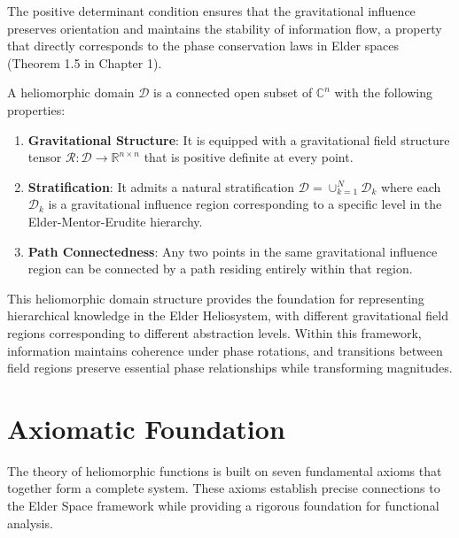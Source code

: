 \begin{remark}
The positive determinant condition ensures that the gravitational influence preserves orientation and maintains the stability of information flow, a property that directly corresponds to the phase conservation laws in Elder spaces (Theorem 1.5 in Chapter 1).
\end{remark}

\begin{definition}
A heliomorphic domain $\mathcal{D}$ is a connected open subset of $\mathbb{C}^n$ with the following properties:
\begin{enumerate}
    \item \textbf{Gravitational Structure}: It is equipped with a gravitational field structure tensor $\mathcal{R}: \mathcal{D} \rightarrow \mathbb{R}^{n \times n}$ that is positive definite at every point.
    
    \item \textbf{Stratification}: It admits a natural stratification $\mathcal{D} = \cup_{k=1}^N \mathcal{D}_k$ where each $\mathcal{D}_k$ is a gravitational influence region corresponding to a specific level in the Elder-Mentor-Erudite hierarchy.
    
    \item \textbf{Path Connectedness}: Any two points in the same gravitational influence region can be connected by a path residing entirely within that region.
\end{enumerate}
\end{definition}

This heliomorphic domain structure provides the foundation for representing hierarchical knowledge in the Elder Heliosystem, with different gravitational field regions corresponding to different abstraction levels. Within this framework, information maintains coherence under phase rotations, and transitions between field regions preserve essential phase relationships while transforming magnitudes.

\section{Axiomatic Foundation}

The theory of heliomorphic functions is built on seven fundamental axioms that together form a complete system. These axioms establish precise connections to the Elder Space framework while providing a rigorous foundation for functional analysis.

